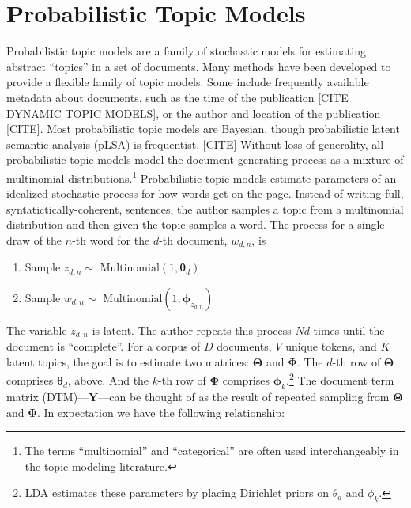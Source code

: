 \documentclass[conference,final,]{IEEEtran}
\providecommand{\tightlist}{%
  \setlength{\itemsep}{0pt}\setlength{\parskip}{0pt}}
\begin{document}
\hypertarget{probabilistic-topic-models}{%
\section{Probabilistic Topic Models}\label{probabilistic-topic-models}}

Probabilistic topic models are a family of stochastic models for
estimating abstract ``topics'' in a set of documents. Many methods have
been developed to provide a flexible family of topic models. Some
include frequently available metadata about documents, such as the time
of the publication {[}CITE DYNAMIC TOPIC MODELS{]}, or the author and
location of the publication {[}CITE{]}. Most probabilistic topic models
are Bayesian, though probabilistic latent semantic analysis (pLSA) is
frequentist. {[}CITE{]} Without loss of generality, all probabilistic
topic models model the document-generating process as a mixture of
multinomial distributions.\footnote{The terms ``multinomial'' and
  ``categorical'' are often used interchangeably in the topic modeling
  literature.} Probabilistic topic models estimate parameters of an
idealized stochastic process for how words get on the page. Instead of
writing full, syntatictically-coherent, sentences, the author samples a
topic from a multinomial distribution and then given the topic samples a
word. The process for a single draw of the \(n\)-th word for the
\(d\)-th document, \(w_{d,n}\), is

\begin{enumerate}
\def\labelenumi{\arabic{enumi}.}
\tightlist
\item
  Sample \(z_{d,n}\sim\) \(\text{Multinomial}(1,\boldsymbol\theta_d)\)
\item
  Sample \(w_{d,n}\sim\)
  \(\text{Multinomial}(1,\boldsymbol\phi_{z_{d,n}})\)
\end{enumerate}

The variable \(z_{d,n}\) is latent. The author repeats this process
\(Nd\) times until the document is ``complete''. For a corpus of \(D\)
documents, \(V\) unique tokens, and \(K\) latent topics, the goal is to
estimate two matrices: \(\boldsymbol\Theta\) and \(\boldsymbol\Phi\).
The \(d\)-th row of \(\boldsymbol\Theta\) comprises
\(\boldsymbol\theta_d\), above. And the \(k\)-th row of
\(\boldsymbol\Phi\) comprises \(\boldsymbol\phi_k\).\footnote{LDA
  estimates these parameters by placing Dirichlet priors on \(\theta_d\)
  and \(\phi_k\).} The document term matrix (DTM)---\(\mathbf{Y}\)---can
be thought of as the result of repeated sampling from
\(\boldsymbol\Theta\) and \(\boldsymbol\Phi\). In expectation we have
the following relationship:
\end{document}
